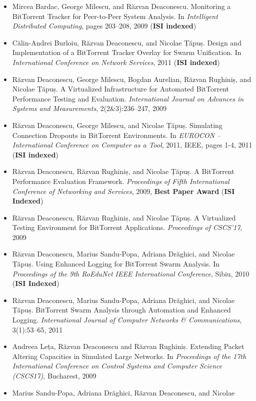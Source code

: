 \begin{itemize}
  \item Mircea Bardac, George Milescu, and Răzvan Deaconescu. Monitoring a
  BitTorrent Tracker for Peer-to-Peer System Analysis. In \textit{Intelligent
  Distributed Computing}, pages 203--208, 2009 (\textbf{ISI indexed})
  \item Călin-Andrei Burloiu, Răzvan Deaconescu, and Nicolae Țăpuș. Design and
  Implementation of a BitTorrent Tracker Overlay for Swarm Unification. In
  \textit{International Conference on Network Services}, 2011 (\textbf{ISI
  indexed})
  \item Răzvan Deaconescu, George Milescu, Bogdan Aurelian, Răzvan Rughiniș,
  and Nicolae Țăpuș. A Virtualized Infrastructure for Automated BitTorrent
  Performance Testing and Evaluation. \textit{International Journal on
  Advances in Systems and Measurements}, 2(2\&3):236--247, 2009
  \item Răzvan Deaconescu, George Milescu, and Nicolae Țăpuș. Simulating
  Connection Dropouts in BitTorrent Environments. In \textit{EUROCON --
  International Conference on Computer as a Tool}, 2011, IEEE, pages 1-4, 2011
  (\textbf{ISI indexed})
  \item Răzvan Deaconescu, Răzvan Rughiniș, and Nicolae Țăpuș. A BitTorrent
  Performance Evaluation Framework. \textit{Proceedings of Fifth International
  Conference of Networking and Services}, 2009, \textbf{Best Paper Award}
  (\textbf{ISI Indexed})
  \item Răzvan Deaconescu, Răzvan Rughiniș, and Nicolae Țăpuș. A Virtualized
  Testing Environment for BitTorrent Applications. \textit{Proceedings of
  CSCS'17}, 2009
  \item Răzvan Deaconescu, Marius Sandu-Popa, Adriana Drăghici, and Nicolae
  Țăpuș. Using Enhanced Logging for BitTorrent Swarm Analysis. In
  \textit{Proceedings of the 9th RoEduNet IEEE International Conference},
  Sibiu, 2010 (\textbf{ISI Indexed})
  \item Răzvan Deaconescu, Marius Sandu-Popa, Adriana Drăghici, and Nicolae
  Țăpuș. BitTorrent Swarm Analysis through Automation and Enhanced Logging.
  \textit{International Journal of Computer Networks \& Communications},
  3(1):53--65, 2011
  \item Andreea Leța, Răzvan Deaconescu and Răzvan Rughiniș. Extending Packet
  Altering Capacities in Simulated Large Networks. In \textit{Proceedings of
  the 17th International Conference on Control Systems and Computer Science
  (CSCS17)}, Bucharest, 2009
  \item Marius Sandu-Popa, Adriana Drăghici, Răzvan Deaconescu, and Nicolae

\end{itemize}
